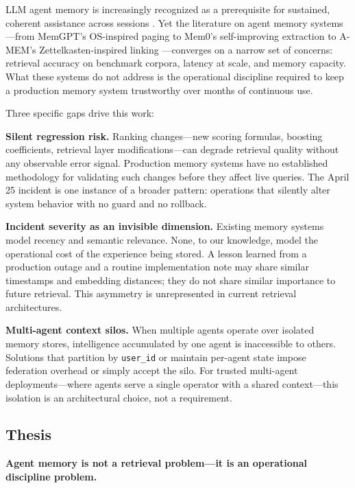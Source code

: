 \documentclass{article}
\begin{document}
LLM agent memory is increasingly recognized as a prerequisite for sustained, coherent
assistance across sessions \cite{lewis2020rag, packer2023memgpt}. Yet the literature on
agent memory systems---from MemGPT's OS-inspired paging \cite{packer2023memgpt} to Mem0's
self-improving extraction \cite{chhikara2025mem0} to A-MEM's Zettelkasten-inspired linking
\cite{xu2025amem}---converges on a narrow set of concerns: retrieval accuracy on benchmark
corpora, latency at scale, and memory capacity. What these systems do not address is the
operational discipline required to keep a production memory system trustworthy over months
of continuous use.

Three specific gaps drive this work:

\textbf{Silent regression risk.} Ranking changes---new scoring formulas, boosting
coefficients, retrieval layer modifications---can degrade retrieval quality without any
observable error signal. Production memory systems have no established methodology for
validating such changes before they affect live queries. The April 25 incident is one
instance of a broader pattern: operations that silently alter system behavior with no guard
and no rollback.

\textbf{Incident severity as an invisible dimension.} Existing memory systems model recency
and semantic relevance. None, to our knowledge, model the operational cost of the
experience being stored. A lesson learned from a production outage and a routine
implementation note may share similar timestamps and embedding distances; they do not share
similar importance to future retrieval. This asymmetry is unrepresented in current
retrieval architectures.

\textbf{Multi-agent context silos.} When multiple agents operate over isolated memory
stores, intelligence accumulated by one agent is inaccessible to others. Solutions that
partition by \texttt{user\_id} \cite{chhikara2025mem0} or maintain per-agent state
\cite{packer2023memgpt} impose federation overhead or simply accept the silo. For trusted
multi-agent deployments---where agents serve a single operator with a shared context---this
isolation is an architectural choice, not a requirement.

\subsection{Thesis}

\textbf{Agent memory is not a retrieval problem---it is an operational discipline problem.}
\end{document}
